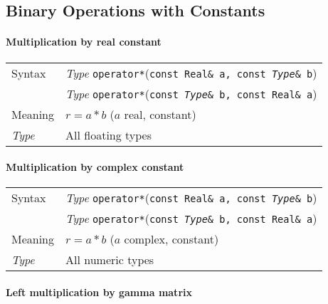 \documentclass[12pt,letterpaper]{article}
\newcommand{\tReal}{Real}
\newcommand{\allNumericTypes}{All numeric types}
\newcommand{\allFloatTypes}{All floating types}
\newcommand{\itt}{\it Type}
\begin{document}
\subsection{Binary Operations with Constants}

\paragraph{Multiplication by real constant}

\begin{flushleft}
  \begin{tabular}{|l|l|}
  \hline
  Syntax      & {\it Type} \verb|operator*|({\tt const \tReal\& a, const {\it Type}\& b})\\
              & {\it Type} \verb|operator*|({\tt const {\it Type}\& b, const \tReal\& a})\\
  \hline
  Meaning     & $r = a*b$ ($a$ real, constant)\\
  \hline
  \itt     & \allFloatTypes \\
  \hline
  \end{tabular}
\end{flushleft}

\paragraph{Multiplication by complex constant}

\begin{flushleft}
  \begin{tabular}{|l|l|}
  \hline
  Syntax      & {\it Type} \verb|operator*|({\tt const \tReal\& a, const {\it Type}\& b})\\
              & {\it Type} \verb|operator*|({\tt const {\it Type}\& b, const \tReal\& a})\\
  \hline
  Meaning     & $r = a*b$ ($a$ complex, constant)\\
  \hline
  \itt     & \allNumericTypes \\
  \hline
  \end{tabular}
\end{flushleft}

\paragraph{Left multiplication by gamma matrix}
\end{document}

